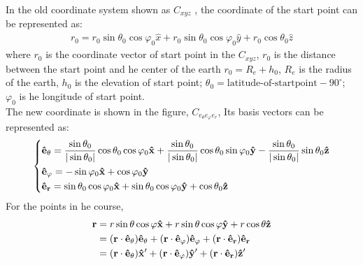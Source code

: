 \documentclass{mcmthesis}
\begin{document}
  In the old coordinate system shown as $C_{xyz}$ , the coordinate of the start point can be represented as:
  \begin{equation}
    \begin{aligned}
      r_{0} = r_0 \sin \theta_0 \cos \varphi_{0} \hat{x} + r_0 \sin \theta_0 \cos \varphi_0 \hat{y} + r_0 \cos \theta_{0} \hat{z}
    \end{aligned}
  \end{equation}
  where $r_0$ is the coordinate vector of start point in the $C_{xyz}$, $r_0$ is the distance between the start point and he center of the earth $r_0 = R_{e} + h_0$, $R_{e}$ is the radius of the earth, $h_0$ is the elevation of start point; $\theta_0 = \text{latitude-of-startpoint} - 90^\circ$; $\varphi_0$ is he longitude of start point.\\
  The new coordinate is shown in the figure, $C_{e_\theta e_\varphi e_r}$, Its basis vectors can be represented as:
  \begin{equation}
    \left\{
    \begin{aligned}
      &{\bf \hat{e}_{\theta}} = \frac{\sin \theta_0}{|\sin \theta_0|} \cos \theta_0\cos \varphi_0 {\bf \hat{x}} + \frac{\sin \theta_0}{|\sin \theta_0|}\cos \theta_0 \sin\varphi_0 {\bf \hat{y}} - \frac{\sin \theta_0}{|\sin \theta_0|}\sin \theta_0 {\bf \hat{z}} \\
      & {\bf \hat{e}_{\varphi}} = -\sin \varphi_0 {\bf \hat{x}} + \cos \varphi_0 {\bf \hat{y}}\\
      & {\bf \hat{e}_{r}} = \sin \theta_0 \cos \varphi_0 {\bf \hat{x}} + \sin \theta_0 \cos \varphi_0 {\bf \hat{y}} + \cos \theta_{0} {\bf \hat{z}}
    \end{aligned}
    \right.
  \end{equation}
  For the points in he course,
  \begin{equation}
    \begin{aligned}
      {\bf r} &= r\sin \theta \cos \varphi {\bf \hat{x}} + r\sin \theta \cos \varphi {\bf \hat{y}} + r\cos \theta {\bf \hat{z}}\\
              &= ({\bf r}\cdot {\bf \hat{e}_{\theta}}) {\bf \hat{e}_{\theta}} + ({\bf r}\cdot {\bf \hat{e}_{\varphi}}){\bf \hat{e}_{\varphi}} + ({\bf r}\cdot {\bf \hat{e}_{r}}){\bf \hat{e}_{r}}\\
              &= ({\bf r}\cdot {\bf \hat{e}_{\theta}}) {\bf \hat{x}'} + ({\bf r}\cdot {\bf \hat{e}_{\varphi}}) {\bf \hat{y}'} + ({\bf r}\cdot {\bf \hat{e}_{r}}){\bf \hat{z}'}
    \end{aligned}
  \end{equation}
\end{document}
